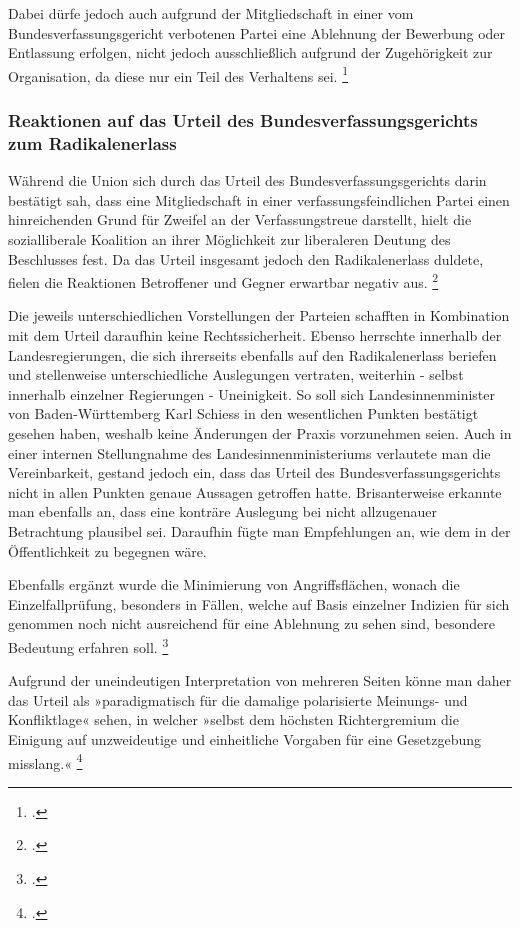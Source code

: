 \documentclass[12pt]{scrartcl}
\begin{document}
Dabei dürfe jedoch auch aufgrund der Mitgliedschaft in einer vom Bundesverfassungsgericht verbotenen Partei eine Ablehnung der Bewerbung oder Entlassung erfolgen, nicht jedoch ausschließlich aufgrund der Zugehörigkeit zur Organisation, da diese nur ein Teil des Verhaltens sei. \footcite[][S. 269]{edgar_wolfrum_verfassungsfeinde_2022}

\subsubsection{Reaktionen auf das Urteil des Bundesverfassungsgerichts zum Radikalenerlass}

Während die Union sich durch das Urteil des Bundesverfassungsgerichts darin bestätigt sah, dass eine Mitgliedschaft in einer verfassungsfeindlichen Partei einen hinreichenden Grund für Zweifel an der Verfassungstreue darstellt, hielt die sozialliberale Koalition an ihrer Möglichkeit zur liberaleren Deutung des Beschlusses fest.  Da das Urteil insgesamt jedoch den Radikalenerlass duldete, fielen die Reaktionen Betroffener und Gegner erwartbar negativ aus. \footcite[][S. 269]{edgar_wolfrum_verfassungsfeinde_2022}

Die jeweils unterschiedlichen Vorstellungen der Parteien schafften in Kombination mit dem Urteil daraufhin keine Rechtssicherheit. Ebenso herrschte innerhalb der Landesregierungen, die sich ihrerseits ebenfalls auf den Radikalenerlass beriefen und stellenweise unterschiedliche Auslegungen vertraten, weiterhin - selbst innerhalb einzelner Regierungen - Uneinigkeit. So soll sich Landesinnenminister von Baden-Württemberg Karl Schiess in den wesentlichen Punkten bestätigt gesehen haben, weshalb keine Änderungen der Praxis vorzunehmen seien. Auch in einer internen Stellungnahme des Landesinnenministeriums verlautete man die Vereinbarkeit, gestand jedoch ein, dass das Urteil des Bundesverfassungsgerichts nicht in allen Punkten genaue Aussagen getroffen hatte. Brisanterweise erkannte man ebenfalls an, dass eine konträre Auslegung bei nicht allzugenauer Betrachtung plausibel sei. Daraufhin fügte man Empfehlungen an, wie dem in der Öffentlichkeit zu begegnen wäre.

Ebenfalls ergänzt wurde die Minimierung von Angriffsflächen, wonach die Einzelfallprüfung, besonders in Fällen, welche auf Basis einzelner Indizien für sich genommen noch nicht ausreichend für eine Ablehnung zu sehen sind, besondere Bedeutung erfahren soll. \footcite[][S. 271]{edgar_wolfrum_verfassungsfeinde_2022}

Aufgrund der uneindeutigen Interpretation von mehreren Seiten könne man daher das Urteil als »paradigmatisch für die damalige polarisierte Meinungs- und Konfliktlage« sehen, in welcher »selbst dem höchsten Richtergremium die Einigung auf unzweideutige und einheitliche Vorgaben für eine Gesetzgebung misslang.« \footcite[][S. 272]{edgar_wolfrum_verfassungsfeinde_2022}
\end{document}
